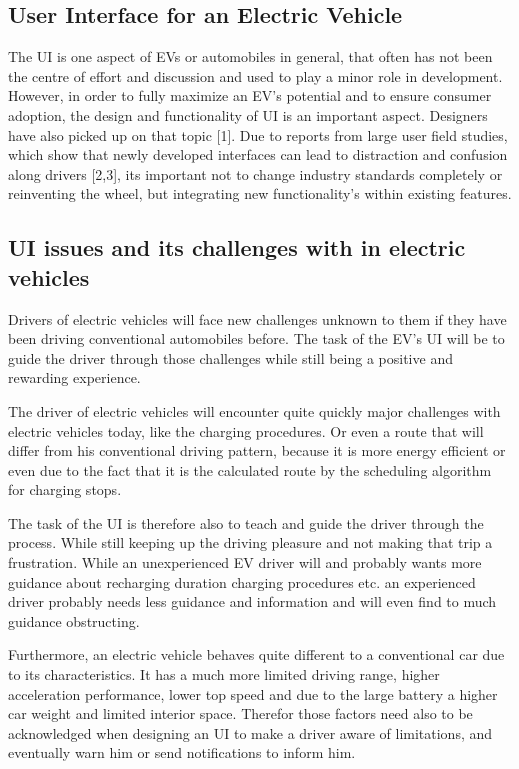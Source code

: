 \clearpage

\subsection{User Interface for an Electric Vehicle}

The UI is one aspect of EVs or automobiles in general, that often has not been the centre of effort and discussion and used to play a minor role in development. However, in order to fully maximize an EV’s potential and to ensure consumer adoption, the design and functionality of UI is an important aspect. Designers have also picked up on that topic [1]. Due to reports from large user field studies, which show that newly developed interfaces can lead to distraction and confusion along drivers [2,3], its important not to change industry standards completely or reinventing the wheel, but integrating new functionality’s within existing features. 

\subsection{UI issues and its challenges with in electric vehicles}

Drivers of electric vehicles will face new challenges unknown to them if they have been driving conventional automobiles before. The task of the EV’s UI will be to guide the driver through those challenges while still being a positive and rewarding experience.

The driver of electric vehicles will encounter quite quickly major challenges with electric vehicles today, like the charging procedures. Or even a route that will differ from his conventional driving pattern, because it is more energy efficient or even due to the fact that it is the calculated route by the scheduling algorithm for charging stops.

The task of the UI is therefore also to teach and guide the driver through the process. While still keeping up the driving pleasure and not making that trip a frustration. While an unexperienced EV driver will and probably wants more guidance about recharging duration charging procedures etc. an experienced driver probably needs less guidance and information and will even find to much guidance obstructing.

Furthermore, an electric vehicle behaves quite different to a conventional car due to its characteristics. It has a much more limited driving range, higher acceleration performance, lower top speed and due to the large battery a higher car weight and limited interior space. Therefor those factors need also to be acknowledged when designing an UI to make a driver aware of limitations, and eventually warn him or send notifications to inform him. 


